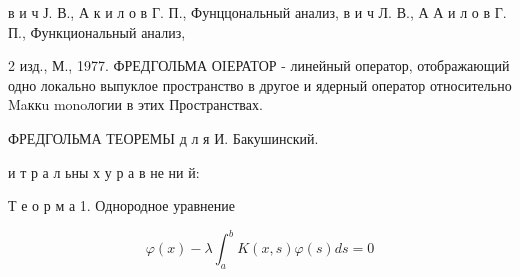 \documentclass[10pt]{article}
\begin{document}
в и ч Ј. В., А к и л о в Г. П., Фунццональный анализ, в и ч Л. В., А А и л о в Г. П., Функциональный анализ,

2 изд., М., 1977. ФРЕДГОЛЬМА ОIЕРАТОР - линейный оператор, отображающий одно локально выпуклое пространство в другое и ядерный оператор относительно Maккu monoлогии в этих Пространствах.

ФРЕДГОЛЬМА ТЕОРЕМЬІ д л я И. Бакушинский.

и т р а л ьны х у р а в не ни й:



Т е о р м а 1. Однородное уравнение



\[

\varphi(x)-\lambda \int_{a}^{b} K(x, s) \varphi(s) d s=0

\]
\end{document}
